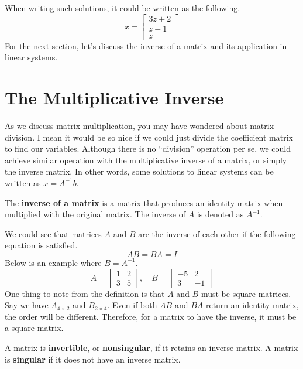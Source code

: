 \documentclass[../main.tex]{subfiles}
\begin{document}
When writing such solutions, it could be written as the following.
\[
x =
\begin{bmatrix}
    3z + 2 \\
    z - 1 \\
    z
\end{bmatrix}
\]
For the next section, let's discuss the inverse of a matrix and its
application in linear systems.

\section{The Multiplicative Inverse}

As we discuss matrix multiplication, you may have wondered about
matrix division. I mean it would be so nice if we could just
divide the coefficient matrix to find our variables. Although there
is no ``division'' operation per se, we could achieve similar
operation with the multiplicative inverse of a matrix, or simply
the inverse matrix. In other words, some solutions to linear systems
can be written as $x = A^{-1}b$.

\begin{definition}
The \textbf{inverse of a matrix} is a matrix that produces an identity
matrix when multiplied with the original matrix. The inverse of
$A$ is denoted as $A^{-1}$.
\end{definition}

We could see that matrices $A$ and $B$ are the inverse of each other
if the following equation is satisfied.
\[
AB = BA = I
\]
Below is an example where $B = A^{-1}$.
\[
A =
\begin{bmatrix}
    1 & 2 \\
    3 & 5
\end{bmatrix},
\quad
B =
\begin{bmatrix}
    -5 & 2 \\
    3  & -1
\end{bmatrix}
\]
One thing to note from the definition is that $A$ and $B$ must be
square matrices. Say we have $A_{4 \times 2}$ and $B_{2 \times 4}$.
Even if both $AB$ and $BA$ return an identity matrix, the order will
be different. Therefore, for a matrix to have the inverse, it must
be a square matrix.

\begin{definition}
A matrix is \textbf{invertible}, or \textbf{nonsingular}, if it
retains an inverse matrix. A matrix is \textbf{singular} if it
does not have an inverse matrix.
\end{definition}
\end{document}

